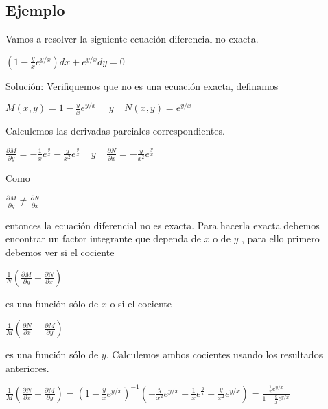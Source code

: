 \documentclass[l etterpaper,11pt]{article}
\begin{document}
\subsection{Ejemplo}


Vamos a resolver la siguiente ecuación diferencial no exacta.
\begin{center}

$(1-\frac{y}{x}e^{y/x})dx+e^{y/x}dy=0$\\
\end{center}

Solución: Verifiquemos que no es una ecuación exacta, definamos
\begin{center}

$M\left(x,y\right)=1-\frac{y}{x}e^{y/x}\ \ \ \ \ \ y\ \ \ \ \ N\left(x,y\right)=e^{y/x}$\\
\end{center}

Calculemos las derivadas parciales correspondientes.
\begin{center}

$\frac{\partial M}{\partial y}=-\frac{1}{x}e^\frac{y}{x}-\frac{y}{x^2}e^\frac{y}{x}\ \ \ \ \ y\ \ \ \ \ \frac{\partial N}{\partial x}=-\frac{y}{x^2}e^\frac{y}{x}$\\

\end{center}

Como
\begin{center}

$\frac{\partial M}{\partial y}\neq\frac{\partial N}{\partial x}$\\
\end{center}

entonces la ecuación diferencial no es exacta. Para hacerla exacta debemos encontrar un factor integrante que dependa de $ x $ o de  $ y $ , para ello primero debemos ver si el cociente
\begin{center}


$\frac{1}{N}(\frac{\partial M}{\partial y}-\frac{\partial N}{\partial x}) $\\
\end{center}

es una función sólo de $ x $ o si el cociente
\begin{center}

$\frac{1}{M}(\frac{\partial N}{\partial x}-\frac{\partial M}{\partial y}) $\\
\end{center}

es una función sólo de $ y $. Calculemos ambos cocientes usando los resultados anteriores.
\begin{center}

$\frac{1}{M}\left(\frac{\partial N}{\partial x}-\frac{\partial M}{\partial y}\right)=\left(1-\frac{y}{x}e^{y/x}\right)^{-1}\left(-\frac{y}{x^2}e^{y/x}+\frac{1}{x}e^\frac{y}{x}+\frac{y}{x^2}e^{y/x}\right)=\frac{\frac{1}{x}e^{y/x}}{1-\frac{y}{x}e^{y/x}}$\\
\end{center}
\end{document}
